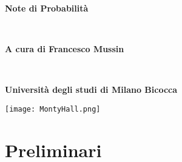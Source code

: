 \documentclass[11pt]{book}
\theoremstyle{Definizione}
\theoremstyle{TeoremaProposizioneLemmaCorollario}
\theoremstyle{OsservazioneNota}
\begin{document}
\begin{titlepage}
\begin{center}
\begin{Huge}
\textbf{Note di Probabilità}
\end{Huge}
\vspace{0.5cm}
\\
\begin{large}
\textbf{A cura di Francesco Mussin}
\end{large}
\\
\vspace{0.25cm}
\begin{large}
\textbf{Università degli studi di Milano Bicocca}
\end{large}
\end{center}
\vspace{1cm}
\begin{center}
\texttt{[image: MontyHall.png]}  
\end{center}
\end{titlepage}
\nopagecolor
\tableofcontents
\chapter{Preliminari}
\end{document}
